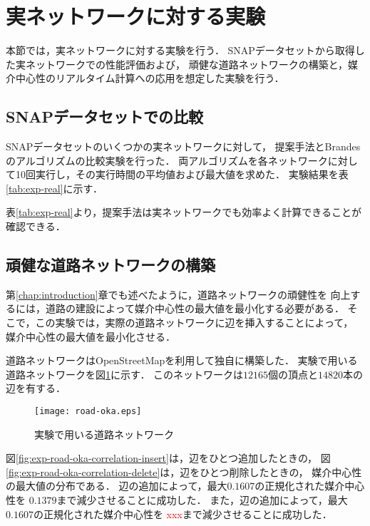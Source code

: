 \section{実ネットワークに対する実験}
\label{sect:exp-realnet}

本節では，実ネットワークに対する実験を行う．
SNAPデータセット\cite{Leskovec2016}から取得した実ネットワークでの性能評価および，
頑健な道路ネットワークの構築と，媒介中心性のリアルタイム計算への応用を想定した実験を行う．

\subsection{SNAPデータセットでの比較}
\label{subsect:exp-real}

SNAPデータセットのいくつかの実ネットワークに対して，
提案手法とBrandesのアルゴリズムの比較実験を行った．
両アルゴリズムを各ネットワークに対して10回実行し，その実行時間の平均値および最大値を求めた．
実験結果を表\ref{tab:exp-real}に示す．



表\ref{tab:exp-real}より，提案手法は実ネットワークでも効率よく計算できることが確認できる．

\subsection{頑健な道路ネットワークの構築}
\label{subsect:exp-road}

第\ref{chap:introduction}章でも述べたように，道路ネットワークの頑健性を
向上するには，道路の建設によって媒介中心性の最大値を最小化する必要がある．
そこで，この実験では，実際の道路ネットワークに辺を挿入することによって，
媒介中心性の最大値を最小化させる．

道路ネットワークはOpenStreetMap\cite{OpenStreetMap}を利用して独自に構築した．
実験で用いる道路ネットワークを図\ref{fig:road-okayama}に示す．
このネットワークは$12165$個の頂点と$14820$本の辺を有する．

\begin{figure}[tb]
  \centering
  \texttt{[image: road-oka.eps]}
  \caption{実験で用いる道路ネットワーク}
  \label{fig:road-okayama}
\end{figure}

図\ref{fig:exp-road-oka-correlation-insert}は，辺をひとつ追加したときの，
図\ref{fig:exp-road-oka-correlation-delete}は，辺をひとつ削除したときの，
媒介中心性の最大値の分布である．
辺の追加によって，最大$0.1607$の正規化された媒介中心性を
$0.1379$まで減少させることに成功した．
また，辺の追加によって，最大$0.1607$の正規化された媒介中心性を
\textcolor{red}{xxx}まで減少させることに成功した．


